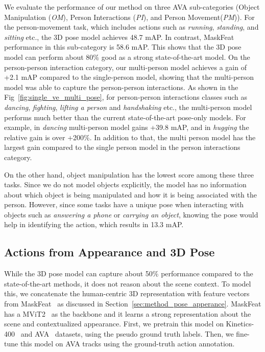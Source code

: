 We evaluate the performance of our method on three AVA sub-categories (Object Manipulation (\textit{OM}), Person Interactions (\textit{PI}), and Person Movement(\textit{PM})). For the person-movement task, which includes actions such as \textit{running}, \textit{standing}, and \textit{sitting} etc., the 3D pose model achieves 48.7 mAP. In contrast, MaskFeat performance in this sub-category is 58.6 mAP. This shows that the 3D pose model can perform about 80\% good as a strong state-of-the-art model. On the person-person interaction category, our multi-person model achieves a gain of +2.1 mAP compared to the single-person model, showing that the multi-person model was able to capture the person-person interactions. As shown in the Fig~\ref{fig:single_ve_multi_pose}, for person-person interactions classes such as \textit{dancing}, \textit{fighting}, \textit{lifting a person} and \textit{handshaking} etc., the multi-person model performs much better than the current state-of-the-art pose-only models. For example, in \textit{dancing} multi-person model gains +39.8 mAP, and in \textit{hugging} the relative gain is over +200\%. In addition to that, the multi person model has the largest gain compared to the single person model in the person interactions category.

On the other hand, object manipulation has the lowest score among these three tasks. Since we do not model objects explicitly, the model has no information about which object is being manipulated and how it is being associated with the person. However, since some tasks have a unique pose when interacting with objects such as \textit{answering a phone} or \textit{carrying an object}, knowing the pose would help in identifying the action, which results in 13.3 mAP.

\subsection{Actions from Appearance and 3D Pose}

While the 3D pose model can capture about 50\% performance compared to the state-of-the-art methods, it does not reason about the scene context. To model this, we concatenate the human-centric 3D representation with feature vectors from MaskFeat~\cite{wei2022masked} as discussed in Section~\ref{sec:method_pose_apperance}. MaskFeat has a MViT2~\cite{li2021improved} as the backbone and it learns a strong representation about the scene and contextualized appearance. First, we pretrain this model on Kinetics-400~\cite{kay2017kinetics} and AVA~\cite{gu2018ava} datasets, using the pseudo ground truth labels. Then, we fine-tune this model on AVA tracks using the ground-truth action annotation. 

